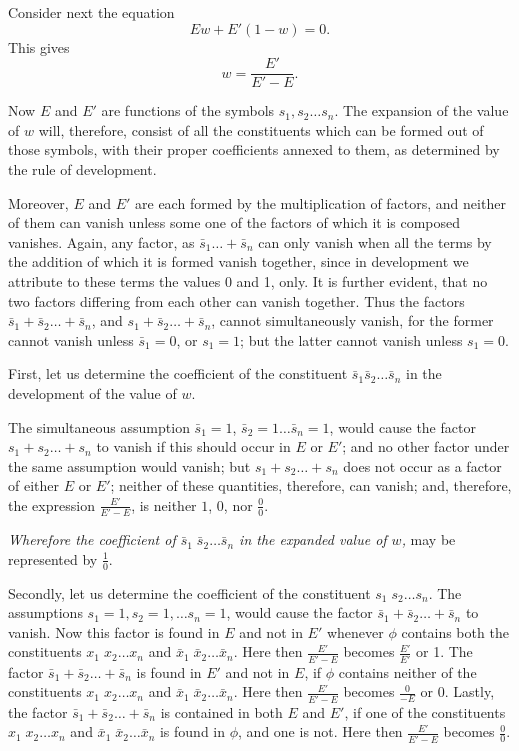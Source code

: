 \documentclass[oneside]{book}
\begin{document}
Consider next the equation
\[
  Ew + E'(1-w) = 0.
\]
This gives
\[
  w = \frac{E'}{E'-E}.   \tag{6}
\]

Now $E$ and $E'$ are functions of the symbols $s_1, s_2 \dotsc s_n$. The
expansion of the value of $w$ will, therefore, consist of all the constituents which can be formed out of those symbols, with their
proper coefficients annexed to them, as determined by the rule
of development.

Moreover, $E$ and $E'$ are each formed by the multiplication of
factors, and neither of them can vanish unless some one of the
factors of which it is composed vanishes. Again, any factor, as
$\bar{s}_1 \dotsc + \bar{s}_n$ can only vanish when all the terms by the addition of
which it is formed vanish together, since in development we attribute to these terms the values 0 and 1, only. It is further evident, that no two factors differing from each other can vanish
together. Thus the factors $\bar{s}_1 + \bar{s}_2 \dotsc + \bar{s}_n$, and $s_1 + \bar{s}_2 \dotsc + \bar{s}_n$, cannot
simultaneously vanish, for the former cannot vanish unless
$\bar{s}_1 = 0$, or $s_1 = 1$; but the latter cannot vanish unless $s_1 = 0$.

First, let us determine the coefficient of the constituent
$\bar{s}_1 \bar{s}_2 \dotsc \bar{s}_n$ in the development of the value of $w$.

The simultaneous assumption $\bar{s}_1 = 1$, $\bar{s}_2 = 1 \dotsc \bar{s}_n = 1$, would
cause the factor $s_1 + s_2 \dotsc + s_n$ to vanish if this should occur in
$E$ or $E'$; and no other factor under the same assumption would
vanish; but $s_1 + s_2 \dotsc + s_n$ does not occur as a factor of either
$E$ or $E'$; neither of these quantities, therefore, can vanish; and,
therefore, the expression $\frac{E'}{E'-E}$, is neither $1$, $0$, nor $\frac{0}{0}$.

\emph{Wherefore the coefficient of
$\bar{s}_1 \; \bar{s}_2 \dotsc \bar{s}_n$ in the expanded value
of $w$,} may be represented by $\frac{1}{0}$.

Secondly, let us determine the coefficient of the constituent
$s_1 \; s_2 \dotsc s_n$.
The assumptions $s_1 = 1, s_2 = 1, \dotsc s_n = 1$, would cause the factor
$\bar{s}_1 + \bar{s}_2 \dotsc + \bar{s}_n$ to vanish. Now this factor is found in $E$ and not
in $E'$ whenever $\phi$ contains both the constituents
$x_1\; x_2 \dotsc x_n$ and
$\bar{x}_1\; \bar{x}_2 \dotsc \bar{x}_n$. Here then $\frac{E'}{E'-E}$ becomes $\frac{E'}{E'}$ or 1.  The factor
$\bar{s}_1 + \bar{s}_2 \dotsc + \bar{s}_n$ is found in $E'$ and not in $E$, if $\phi$ contains neither
of the constituents $x_1\; x_2 \dotsc x_n$ and
$\bar{x}_1\; \bar{x}_2 \dotsc \bar{x}_n$. Here then
$\frac{E'}{E'-E}$ becomes $\frac{0}{-E}$ or 0. Lastly, the factor
$\bar{s}_1 + \bar{s}_2 \dotsc + \bar{s}_n$ is
contained in both $E$ and $E'$, if one of the constituents $x_1\; x_2 \dotsc x_n$ and
$\bar{x}_1\; \bar{x}_2 \dotsc \bar{x}_n$ is found in $\phi$, and one is not. Here then $\frac{E'}{E'-E}$
becomes $\frac{0}{0}$.
\end{document}
